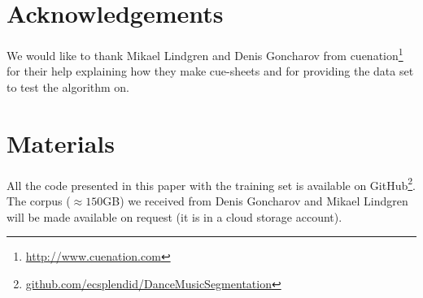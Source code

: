 \documentclass[twocolumn]{article}
\begin{document}
\section{Acknowledgements}\label{sec:acknowledgements}

We would like to thank Mikael Lindgren and Denis Goncharov from cuenation\footnote{\url{http://www.cuenation.com}} for their help explaining how they make cue-sheets and for providing the data set to test the algorithm on.

\section{Materials}\label{sec:materials}

All the code presented in this paper with the training set is available on GitHub\footnote{\url{github.com/ecsplendid/DanceMusicSegmentation}}. The corpus ($\approx150$GB) we received from Denis Goncharov and Mikael Lindgren will be made available on request (it is in a cloud storage account).




\end{document}
